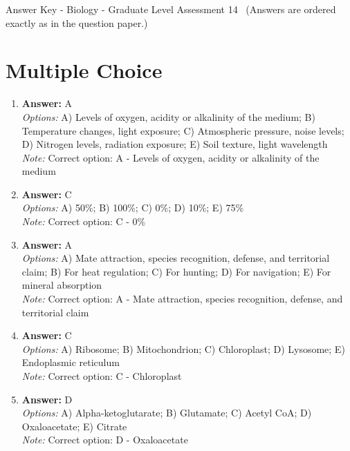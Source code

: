 \documentclass[12pt]{article}
\begin{document}
\begin{center}
Answer Key - Biology - Graduate Level Assessment 14 \
\small (Answers are ordered exactly as in the question paper.)
\end{center}

\section*{Multiple Choice}
\begin{enumerate}[label=\arabic*.]
\item \textbf{Answer:} A
\\ \textit{Options:} A) Levels of oxygen, acidity or alkalinity of the medium; B) Temperature changes, light exposure; C) Atmospheric pressure, noise levels; D) Nitrogen levels, radiation exposure; E) Soil texture, light wavelength
\\ \textit{Note:} Correct option: A - Levels of oxygen, acidity or alkalinity of the medium
\item \textbf{Answer:} C
\\ \textit{Options:} A) 50\%; B) 100\%; C) 0\%; D) 10\%; E) 75\%
\\ \textit{Note:} Correct option: C - 0\%
\item \textbf{Answer:} A
\\ \textit{Options:} A) Mate attraction, species recognition, defense, and territorial claim; B) For heat regulation; C) For hunting; D) For navigation; E) For mineral absorption
\\ \textit{Note:} Correct option: A - Mate attraction, species recognition, defense, and territorial claim
\item \textbf{Answer:} C
\\ \textit{Options:} A) Ribosome; B) Mitochondrion; C) Chloroplast; D) Lysosome; E) Endoplasmic reticulum
\\ \textit{Note:} Correct option: C - Chloroplast
\item \textbf{Answer:} D
\\ \textit{Options:} A) Alpha-ketoglutarate; B) Glutamate; C) Acetyl CoA; D) Oxaloacetate; E) Citrate
\\ \textit{Note:} Correct option: D - Oxaloacetate
\end{enumerate}
\end{document}
